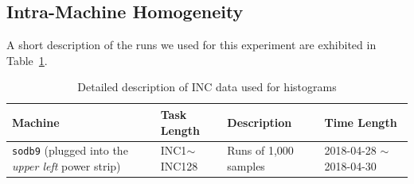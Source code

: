 \newpage
\clearpage

\subsection{Intra-Machine Homogeneity~\label{sec:intra_machine}} 

A short description of the runs we used for this experiment are exhibited in Table~\ref{tab:exp_notes3}.

\begin{table}[h]
\begin{center}
\begin{tabular}{|p{4cm}|p{3cm}|p{4cm}|p{4cm}|} \hline
Machine & Task Length & Description & Time Length\\ \hline
{\tt sodb9}  (plugged into the {\em upper left} power strip) &  INC1$\sim$INC128 & Runs of 1,000 samples & 2018-04-28 $\sim$2018-04-30\\ \hline
\end{tabular}
\end{center}
\vspace{-.2in}
\caption{Detailed description of INC data used for histograms\label{tab:exp_notes3}}
\end{table}


